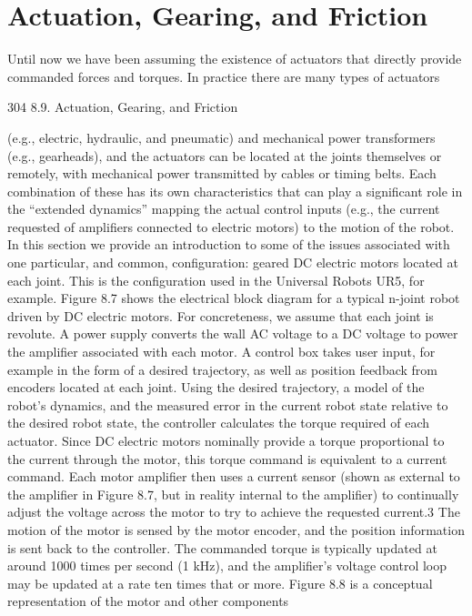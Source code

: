\documentclass[12pt,a4paper]{article}
\begin{document}
\section{Actuation, Gearing, and Friction}
Until now we have been assuming the existence of actuators that directly provide
commanded forces and torques. In practice there are many types of actuators


304                                                      8.9. Actuation, Gearing, and Friction

(e.g., electric, hydraulic, and pneumatic) and mechanical power transformers
(e.g., gearheads), and the actuators can be located at the joints themselves or
remotely, with mechanical power transmitted by cables or timing belts. Each
combination of these has its own characteristics that can play a significant role
in the “extended dynamics” mapping the actual control inputs (e.g., the current
requested of amplifiers connected to electric motors) to the motion of the robot.
    In this section we provide an introduction to some of the issues associated
with one particular, and common, configuration: geared DC electric motors
located at each joint. This is the configuration used in the Universal Robots
UR5, for example.
    Figure 8.7 shows the electrical block diagram for a typical n-joint robot
driven by DC electric motors. For concreteness, we assume that each joint is
revolute. A power supply converts the wall AC voltage to a DC voltage to power
the amplifier associated with each motor. A control box takes user input, for
example in the form of a desired trajectory, as well as position feedback from
encoders located at each joint. Using the desired trajectory, a model of the
robot’s dynamics, and the measured error in the current robot state relative
to the desired robot state, the controller calculates the torque required of each
actuator. Since DC electric motors nominally provide a torque proportional to
the current through the motor, this torque command is equivalent to a current
command. Each motor amplifier then uses a current sensor (shown as external to
the amplifier in Figure 8.7, but in reality internal to the amplifier) to continually
adjust the voltage across the motor to try to achieve the requested current.3
The motion of the motor is sensed by the motor encoder, and the position
information is sent back to the controller.
    The commanded torque is typically updated at around 1000 times per second
(1 kHz), and the amplifier’s voltage control loop may be updated at a rate ten
times that or more.
    Figure 8.8 is a conceptual representation of the motor and other components
\end{document}
